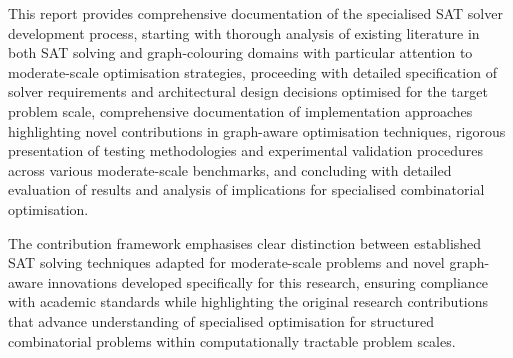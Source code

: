 This report provides comprehensive documentation of the specialised SAT solver development process, starting with thorough analysis of existing literature in both SAT solving and graph-colouring domains with particular attention to moderate-scale optimisation strategies, proceeding with detailed specification of solver requirements and architectural design decisions optimised for the target problem scale, comprehensive documentation of implementation approaches highlighting novel contributions in graph-aware optimisation techniques, rigorous presentation of testing methodologies and experimental validation procedures across various moderate-scale benchmarks, and concluding with detailed evaluation of results and analysis of implications for specialised combinatorial optimisation.

The contribution framework emphasises clear distinction between established SAT solving techniques adapted for moderate-scale problems and novel graph-aware innovations developed specifically for this research, ensuring compliance with academic standards while highlighting the original research contributions that advance understanding of specialised optimisation for structured combinatorial problems within computationally tractable problem scales.